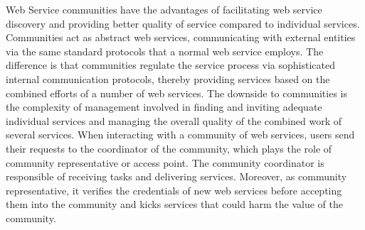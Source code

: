 \documentclass[11pt,onecolumn]{IEEEtran}
\begin{document}
Web Service communities have the advantages of facilitating web service discovery and providing better quality of service compared to individual services. Communities act as abstract web services, communicating with external entities via the same standard protocols that a normal web service employs. The difference is that communities regulate the service process via sophisticated internal communication protocols, thereby providing services based on the combined efforts of a number of web services. The downside to communities is the complexity of management involved in finding and inviting adequate individual services and managing the overall quality of the combined work of several services.
When interacting with a community of web services, users send their requests to the coordinator of the community, which plays the role of community representative or access point. The community coordinator is responsible of receiving tasks and delivering services. Moreover, as community representative, it verifies the credentials of new web services before accepting them into the community and kicks services that could harm the value of the community. 
\end{document}
